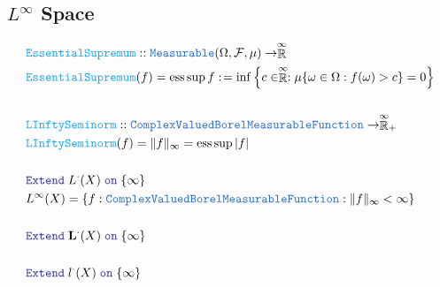 \documentclass[12pt]{article}
\newcommand{\TYPE}[1]{\textcolor{NavyBlue}{\mathtt{#1}}}
\newcommand{\FUNC}[1]{\textcolor{Cerulean}{\mathtt{#1}}}
\newcommand{\LOGIC}[1]{\textcolor{Blue}{\mathtt{#1}}}
\renewcommand{\.}{\; . \;}
\newcommand{\de}{: \kern 0.1pc =}
\newcommand{\EReals}{\stackrel{\mathclap{\infty}}{\mathbb{R}}}
\newcommand{\F}{\mathcal{F}}
\renewcommand{\O}{\Omega}
\newcommand{\CVBMF}{\TYPE{ComplexValuedBorelMeasurableFunction}}
\newcommand{\Lp}{\mathbf{L}}
\DeclareMathOperator*{\esssup}{ess \, sup}
\begin{document}
\subsection{$L^\infty$ Space}
\begin{align*}
&\FUNC{EssentialSupremum} :: \TYPE{Measurable}(\O,\F,\mu) \to \EReals \\
 & \FUNC{EssentialSupremum}(f) = \esssup f \de \inf \left \{ c \in \EReals   : \mu\{ \omega \in \O : f(\omega) > c\} = 0  \right \}
 \\ \\
 & \FUNC{LInftySeminorm  } :: \CVBMF  \to \EReals_{+}  \\
 & \FUNC{LInftySeminorm  }(f) =  \| f \|_\infty =\esssup |f| 
 \\  \\
 &  \LOGIC{Extend} \; L^\cdot (X) \;  \LOGIC{on} \; \{ \infty \} \\  
 &   L^\infty(X) = \{ f : \CVBMF : \| f \|_\infty < \infty \} 
 \\ \\
 &  \LOGIC{Extend} \; \Lp^\cdot (X) \;  \LOGIC{on} \; \{ \infty \} 
 \\  \\
 &  \LOGIC{Extend} \; l^\cdot (X) \;  \LOGIC{on} \; \{ \infty \} 
\end{align*}
\end{document}
